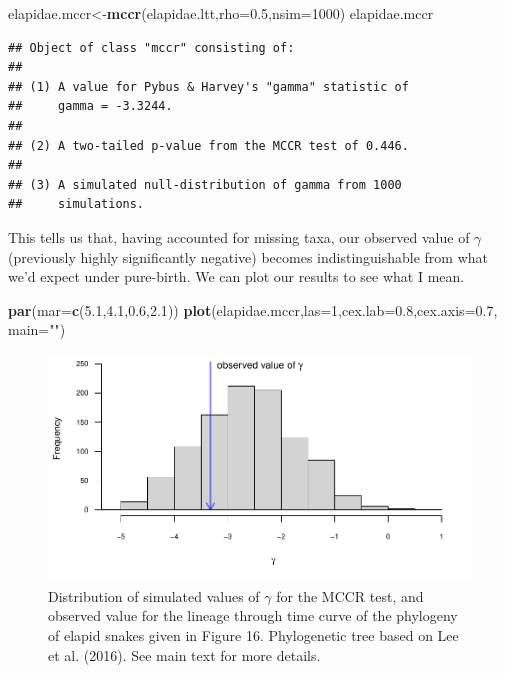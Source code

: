 \documentclass[fleqn,10pt,lineno]{wlpeerj} %
\newenvironment{Shaded}{\begin{snugshade}}{\end{snugshade}}
\newcommand{\AttributeTok}[1]{\textcolor[rgb]{0.13,0.29,0.53}{#1}}
\newcommand{\DecValTok}[1]{\textcolor[rgb]{0.00,0.00,0.81}{#1}}
\newcommand{\FloatTok}[1]{\textcolor[rgb]{0.00,0.00,0.81}{#1}}
\newcommand{\FunctionTok}[1]{\textcolor[rgb]{0.13,0.29,0.53}{\textbf{#1}}}
\newcommand{\NormalTok}[1]{#1}
\newcommand{\OtherTok}[1]{\textcolor[rgb]{0.56,0.35,0.01}{#1}}
\newcommand{\StringTok}[1]{\textcolor[rgb]{0.31,0.60,0.02}{#1}}
\begin{document}
\begin{Shaded}
\begin{Highlighting}[]
\NormalTok{elapidae.mccr}\OtherTok{\textless{}{-}}\FunctionTok{mccr}\NormalTok{(elapidae.ltt,}\AttributeTok{rho=}\FloatTok{0.5}\NormalTok{,}\AttributeTok{nsim=}\DecValTok{1000}\NormalTok{)}
\NormalTok{elapidae.mccr}
\end{Highlighting}
\end{Shaded}

\begin{verbatim}
## Object of class "mccr" consisting of:
## 
## (1) A value for Pybus & Harvey's "gamma" statistic of 
##     gamma = -3.3244.
## 
## (2) A two-tailed p-value from the MCCR test of 0.446.
## 
## (3) A simulated null-distribution of gamma from 1000
##     simulations.
\end{verbatim}

This tells us that, having accounted for missing taxa, our observed value of \(\gamma\) (previously highly significantly negative) becomes indistinguishable from what we'd expect under pure-birth. We can plot our results to see what I mean.

\begin{Shaded}
\begin{Highlighting}[]
\FunctionTok{par}\NormalTok{(}\AttributeTok{mar=}\FunctionTok{c}\NormalTok{(}\FloatTok{5.1}\NormalTok{,}\FloatTok{4.1}\NormalTok{,}\FloatTok{0.6}\NormalTok{,}\FloatTok{2.1}\NormalTok{))}
\FunctionTok{plot}\NormalTok{(elapidae.mccr,}\AttributeTok{las=}\DecValTok{1}\NormalTok{,}\AttributeTok{cex.lab=}\FloatTok{0.8}\NormalTok{,}\AttributeTok{cex.axis=}\FloatTok{0.7}\NormalTok{,}
  \AttributeTok{main=}\StringTok{""}\NormalTok{)}
\end{Highlighting}
\end{Shaded}

\begin{figure}
\includegraphics[width=1\linewidth]{Revell.phytools-v2_peerj_files/figure-latex/fig17-elap-mccr-1} \caption{Distribution of simulated values of $\gamma$ for the MCCR test, and observed value for the lineage through time curve of the phylogeny of elapid snakes given in Figure 16. Phylogenetic tree based on Lee et al. (2016). See main text for more details.}\label{fig:fig17-elap-mccr}
\end{figure}
\end{document}
